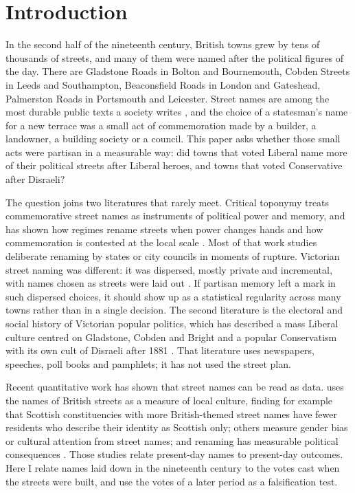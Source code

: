 \documentclass[11pt,a4paper]{article}
\begin{document}
\section{Introduction}
In the second half of the nineteenth century, British towns grew by tens of thousands of streets, and many of them were named after the political figures of the day. There are Gladstone Roads in Bolton and Bournemouth, Cobden Streets in Leeds and Southampton, Beaconsfield Roads in London and Gateshead, Palmerston Roads in Portsmouth and Leicester. Street names are among the most durable public texts a society writes \citep{azaryahu1996,roseredwood2010}, and the choice of a statesman's name for a new terrace was a small act of commemoration made by a builder, a landowner, a building society or a council. This paper asks whether those small acts were partisan in a measurable way: did towns that voted Liberal name more of their political streets after Liberal heroes, and towns that voted Conservative after Disraeli?

The question joins two literatures that rarely meet. Critical toponymy treats commemorative street names as instruments of political power and memory, and has shown how regimes rename streets when power changes hands \citep{azaryahu1997,light2004,lightyoung2014} and how commemoration is contested at the local scale \citep{alderman2000,alderman2003}. Most of that work studies deliberate renaming by states or city councils in moments of rupture. Victorian street naming was different: it was dispersed, mostly private and incremental, with names chosen as streets were laid out \citep{dyos1961}. If partisan memory left a mark in such dispersed choices, it should show up as a statistical regularity across many towns rather than in a single decision. The second literature is the electoral and social history of Victorian popular politics, which has described a mass Liberal culture centred on Gladstone, Cobden and Bright \citep{biagini1992,vincent1966,joyce1980} and a popular Conservatism with its own cult of Disraeli after 1881 \citep{pugh1985,lawrence1998,windscheffel2007}. That literature uses newspapers, speeches, poll books and pamphlets; it has not used the street plan.

Recent quantitative work has shown that street names can be read as data. \citet{oto2018} uses the names of British streets as a measure of local culture, finding for example that Scottish constituencies with more British-themed street names have fewer residents who describe their identity as Scottish only; others measure gender bias \citep{gutierrez2022} or cultural attention \citep{bancilhon2021} from street names; and renaming has measurable political consequences \citep{villamil2021}. Those studies relate present-day names to present-day outcomes. Here I relate names laid down in the nineteenth century to the votes cast when the streets were built, and use the votes of a later period as a falsification test.
\end{document}
